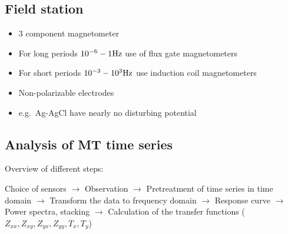 \setcounter{section}{5}\setcounter{subsection}{1}\addtocounter{subsection}{-1}\subsection{Field station }

\begin{itemize}
\tightlist
\item
  3 component magnetometer
\item
  For long periods \(10^{-6}-1 \mathrm{Hz}\) use of flux gate
  magnetometers
\item
  For short periods \(10^{-3}-10^3 \mathrm{Hz}\) use induction coil
  magnetometers
\item
  Non-polarizable electrodes
\item
  e.g.~Ag-AgCl have nearly no disturbing potential
\end{itemize}

\setcounter{section}{5}\setcounter{subsection}{2}\addtocounter{subsection}{-1}\subsection{Analysis of MT time series }

Overview of different steps:

Choice of sensors \(\to\) Observation \(\to\) Pretreatment of time
series in time domain \(\to\) Transform the data to frequency domain
\(\to\) Response curve \(\to\) Power spectra, stacking \(\to\)
Calculation of the transfer functions
(\(Z_{xx}, Z_{xy}, Z_{yx}, Z_{yy}, T_x, T_y\))


